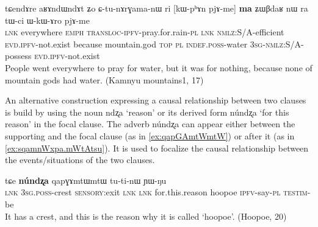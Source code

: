 \documentclass[oldfontcommands,oneside,a4paper,11pt]{article}
\newcommand{\ipa}[1]{{\phon \mbox{#1}}} %
\begin{document}
\begin{exe}
\ex \label{CtunArGamanW}
\gll 
\ipa{tɕendɤre}   	\ipa{aʁɤndɯndɤt}   	\ipa{ʑo}   	\ipa{ɕ-tu-nɤrɣama-nɯ}   	\ipa{ri}   	[\ipa{kɯ-pʰɤn}   	\ipa{pjɤ-me}]   	\ipa{\textbf{ma}}   	\ipa{ʑɯβdaʁ}   	\ipa{nɯ} \ipa{ra}   	\ipa{tɯ-ci}   	\ipa{ɯ-kɯ-ɤro}   	\ipa{pjɤ-me} \\
\textsc{lnk} everywhere \textsc{emph} \textsc{transloc-ipfv}-pray.for.rain-\textsc{pl} \textsc{lnk} \textsc{nmlz}:S/A-efficient \textsc{evd.ipfv}-not.exist because mountain.god \textsc{top} \textsc{pl} \textsc{indef.poss}-water \textsc{3sg-nmlz}:S/A-possess  \textsc{evd.ipfv}-not.exist  \\
 \glt People went everywhere to pray for water, but it was for nothing, because none of mountain gods had water. (Kamnyu mountains1, 17)
\end{exe}

An alternative construction expressing a causal relationship between two clauses  is build by using the  noun  \ipa{ndʐa} `reason' or its derived form \ipa{núndʐa} `for this reason' in the focal clause. The adverb \ipa{núndʐa} can appear either between the supporting and  the focal clause (as in \ref{ex:qapGAmtWmtW}) or after it (as in \ref{ex:sqamnWxpa.mWtAtsu}). It is used to focalize the causal relationship between the events/situations of the two clauses.  

\begin{exe}
\ex \label{ex:qapGAmtWmtW}
\gll
[\ipa{tɕe}  	\ipa{ɯ-mtɯ}  	\ipa{ɣɤʑu}]  	\ipa{tɕe,}  	\ipa{tɕe}  	\textbf{\ipa{núndʐa}}  	\ipa{qapɣɤmtɯmtɯ}  	\ipa{tu-ti-nɯ}  	\ipa{ɲɯ-ŋu}   \\
\textsc{lnk} \textsc{3sg.poss}-crest \textsc{sensory}:exit \textsc{lnk} \textsc{lnk} for.this.reason hoopoe \textsc{ipfv}-say-\textsc{pl} \textsc{testim}-be \\
\glt It has a crest, and this is the reason why it is called `hoopoe'. (Hoopoe, 20)
\end{exe}
\end{document}
